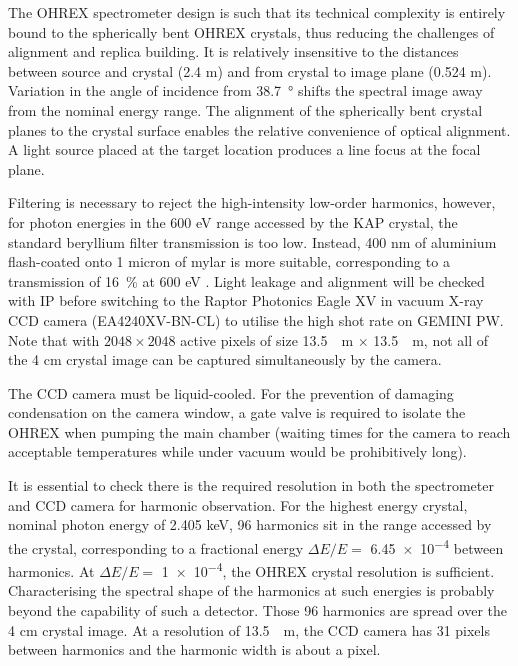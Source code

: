 The OHREX spectrometer design is such that its technical complexity is entirely bound to the spherically bent OHREX crystals, thus reducing the challenges of alignment \cite{beiersdorferLineshapeSpectroscopyVery2016} and replica building. It is relatively insensitive to the distances between source and crystal (2.4 m) and from crystal to image plane (0.524 m). Variation in the angle of incidence from \qty{38.7}{\degree} shifts the spectral image away from the nominal energy range. 
The alignment of the spherically bent crystal planes to the crystal surface enables the relative convenience of optical alignment. A light source placed at the target location produces a line focus at the focal plane. 

Filtering is necessary to reject the high-intensity low-order harmonics, however, for photon energies in the 600 eV range accessed by the KAP crystal, the standard beryllium filter transmission is too low. Instead, 400 nm of aluminium flash-coated onto 1 micron of mylar is more suitable, corresponding to a transmission of \qty{16}{\%} at 600 eV \cite{henkeXRayInteractionsPhotoabsorption1993}. Light leakage and alignment will be checked with IP before switching to the Raptor Photonics Eagle XV in vacuum X-ray CCD camera (EA4240XV-BN-CL) \cite{EagleXVVacuum} to utilise the high shot rate on GEMINI PW. Note that with $2048 \times 2048$ active pixels of size \qty{13.5}{\mu m} $\times$ \qty{13.5}{\mu m}, not all of the 4 cm crystal image can be captured simultaneously by the camera. 

The CCD camera must be liquid-cooled. For the prevention of damaging condensation on the camera window, a gate valve is required to isolate the OHREX when pumping the main chamber (waiting times for the camera to reach acceptable temperatures while under vacuum would be prohibitively long). 

It is essential to check there is the required resolution in both the spectrometer and CCD camera for harmonic observation. For the highest energy crystal, nominal photon energy of 2.405 keV, 96 harmonics sit in the range accessed by the crystal, corresponding to a fractional energy $\Delta E/E =$ \num{6.45e-4} between harmonics. At  $\Delta E/E =$ \num{1e-4}, the OHREX crystal resolution is sufficient. Characterising the spectral shape of the harmonics at such energies is probably beyond the capability of such a detector. Those 96 harmonics are spread over the 4 cm crystal image. At a resolution of \qty{13.5}{\mu m}, the CCD camera has 31 pixels between harmonics and the harmonic width is about a pixel.

